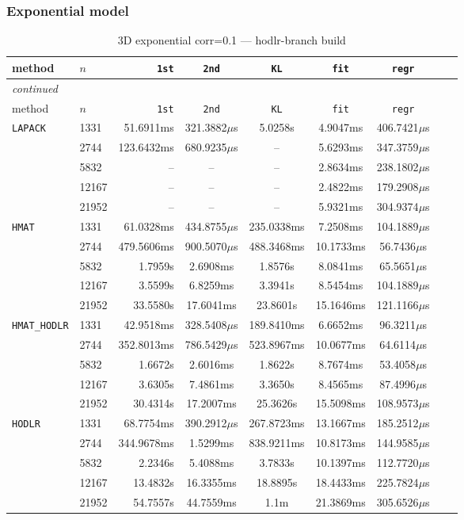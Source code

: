 \documentclass[11pt,a4paper]{article}
\begin{document}
\subsubsection*{Exponential model}
\begin{center}
\begin{longtable}{llrcccccc}
\caption{3D exponential corr=0.1 --- hodlr-branch build}
\\\toprule
method & $n$ & \texttt{1st} & \texttt{2nd} & \texttt{KL} & \texttt{fit} & \texttt{regr}\\
\midrule
\endfirsthead
\multicolumn{8}{l}{\small\emph{continued}}\\
\toprule
method & $n$ & \texttt{1st} & \texttt{2nd} & \texttt{KL} & \texttt{fit} & \texttt{regr}\\
\midrule
\endhead

\texttt{LAPACK} & 1331 & 51.6911ms & 321.3882$\mu$s & 5.0258s & 4.9047ms & 406.7421$\mu$s\\
 & 2744 & 123.6432ms & 680.9235$\mu$s & -- & 5.6293ms & 347.3759$\mu$s\\
 & 5832 & -- & -- & -- & 2.8634ms & 238.1802$\mu$s\\
 & 12167 & -- & -- & -- & 2.4822ms & 179.2908$\mu$s\\
 & 21952 & -- & -- & -- & 5.9321ms & 304.9374$\mu$s\\
\texttt{HMAT} & 1331 & 61.0328ms & 434.8755$\mu$s & 235.0338ms & 7.2508ms & 104.1889$\mu$s\\
 & 2744 & 479.5606ms & 900.5070$\mu$s & 488.3468ms & 10.1733ms & 56.7436$\mu$s\\
 & 5832 & 1.7959s & 2.6908ms & 1.8576s & 8.0841ms & 65.5651$\mu$s\\
 & 12167 & 3.5599s & 6.8259ms & 3.3941s & 8.5454ms & 104.1889$\mu$s\\
 & 21952 & 33.5580s & 17.6041ms & 23.8601s & 15.1646ms & 121.1166$\mu$s\\
\texttt{HMAT\_HODLR} & 1331 & 42.9518ms & 328.5408$\mu$s & 189.8410ms & 6.6652ms & 96.3211$\mu$s\\
 & 2744 & 352.8013ms & 786.5429$\mu$s & 523.8967ms & 10.0677ms & 64.6114$\mu$s\\
 & 5832 & 1.6672s & 2.6016ms & 1.8622s & 8.7674ms & 53.4058$\mu$s\\
 & 12167 & 3.6305s & 7.4861ms & 3.3650s & 8.4565ms & 87.4996$\mu$s\\
 & 21952 & 30.4314s & 17.2007ms & 25.3626s & 15.5098ms & 108.9573$\mu$s\\
\texttt{HODLR} & 1331 & 68.7754ms & 390.2912$\mu$s & 267.8723ms & 13.1667ms & 185.2512$\mu$s\\
 & 2744 & 344.9678ms & 1.5299ms & 838.9211ms & 10.8173ms & 144.9585$\mu$s\\
 & 5832 & 2.2346s & 5.4088ms & 3.7833s & 10.1397ms & 112.7720$\mu$s\\
 & 12167 & 13.4832s & 16.3355ms & 18.8895s & 18.4433ms & 225.7824$\mu$s\\
 & 21952 & 54.7557s & 44.7559ms & 1.1m & 21.3869ms & 305.6526$\mu$s\\
\bottomrule\end{longtable}\end{center}
\end{document}
